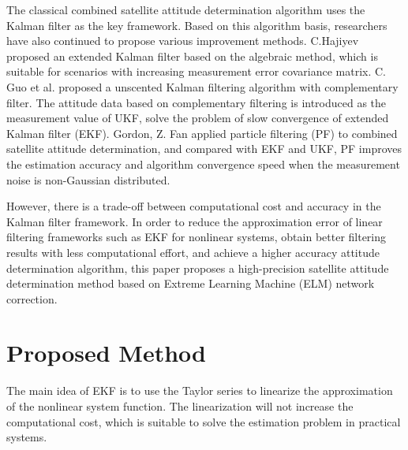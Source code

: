 \documentclass{article}
\begin{document}
	The classical combined satellite attitude determination algorithm uses the Kalman filter as the key framework. Based on this algorithm basis, researchers have also continued to propose various improvement methods. C.Hajiyev\cite{hajiyev2015integration} proposed an extended Kalman filter based on the algebraic method, which is suitable for scenarios with increasing measurement error covariance matrix.
	C. Guo et al.\cite{guo2017high} proposed a unscented Kalman filtering algorithm with complementary filter. The attitude data based on complementary filtering is introduced as the measurement value of UKF, solve the problem of slow convergence of extended Kalman filter (EKF). 
	Gordon\cite{risfic2004beyond}, Z. Fan\cite{zhiru2013research} applied particle filtering (PF) to combined satellite attitude determination, and compared with EKF and UKF, PF improves the estimation accuracy and algorithm convergence speed when the measurement noise is non-Gaussian distributed.
	
	However, there is a trade-off between computational cost and accuracy in the Kalman filter framework. In order to reduce the approximation error of linear filtering frameworks such as EKF for nonlinear systems, obtain better filtering results with less computational effort, and achieve a higher accuracy attitude determination algorithm, this paper proposes a high-precision satellite attitude determination method based on Extreme Learning Machine (ELM) network correction.
	
	\section{Proposed Method}
	\label{sec:method}	
	
	The main idea of EKF is to use the Taylor series to linearize the approximation of the nonlinear system function. The linearization will not increase the computational cost, which is suitable to solve the estimation problem in practical systems\cite{farhangian2020accuracy}.
	
\end{document}
